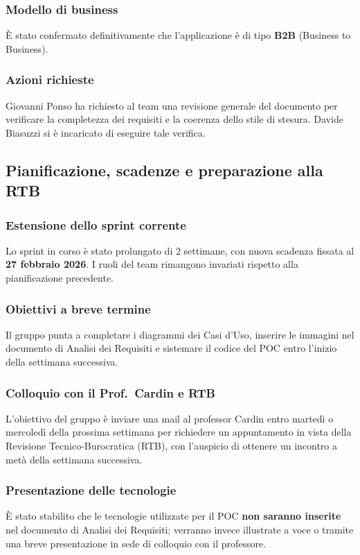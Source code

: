 \documentclass[a4paper, 11pt, oneside]{scrartcl}
\begin{document}
\subsubsection{Modello di business}
È stato confermato definitivamente che l'applicazione è di tipo \textbf{B2B} (Business to Business).

\subsubsection{Azioni richieste}
Giovanni Ponso ha richiesto al team una revisione generale del documento per verificare la completezza dei requisiti e la coerenza dello stile di stesura. Davide Biasuzzi si è incaricato di eseguire tale verifica.

\subsection{Pianificazione, scadenze e preparazione alla RTB}
\subsubsection{Estensione dello sprint corrente}
Lo sprint in corso è stato prolungato di 2 settimane, con nuova scadenza fissata al \textbf{27 febbraio 2026}. I ruoli del team rimangono invariati rispetto alla pianificazione precedente.

\subsubsection{Obiettivi a breve termine}
Il gruppo punta a completare i diagrammi dei Casi d'Uso, inserire le immagini nel documento di Analisi dei Requisiti e sistemare il codice del POC entro l'inizio della settimana successiva.

\subsubsection{Colloquio con il Prof.\ Cardin e RTB}
L'obiettivo del gruppo è inviare una mail al professor Cardin entro martedì o mercoledì della prossima settimana per richiedere un appuntamento in vista della Revisione Tecnico-Burocratica (RTB), con l'auspicio di ottenere un incontro a metà della settimana successiva.

\subsubsection{Presentazione delle tecnologie}
È stato stabilito che le tecnologie utilizzate per il POC \textbf{non saranno inserite} nel documento di Analisi dei Requisiti; verranno invece illustrate a voce o tramite una breve presentazione in sede di colloquio con il professore.
\end{document}
